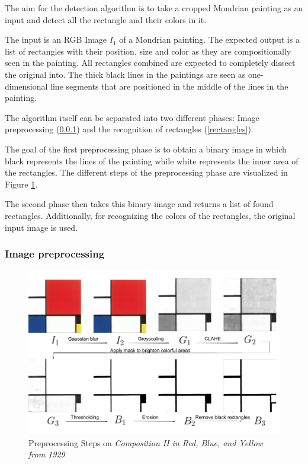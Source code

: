 \documentclass[serif,article,noparskip]{agse-thesis}
\begin{document}
The aim for the detection algorithm is to take a cropped Mondrian painting as
an input and detect all the rectangle and their colors in it.

The input is an RGB Image $I_1$ of a Mondrian painting. The expected output is a
list of rectangles with their position, size and color as they are
compositionally seen in the painting. All rectangles combined are expected to
completely dissect the original into. The thick black lines in the paintings are
seen as one-dimensional line segments that are positioned in the middle of the
lines in the painting.

The algorithm itself can be separated into two different phases: Image
preprocessing (\ref{preprocessing}) and the recognition of rectangles (\ref{rectangles}).

The goal of the first preprocessing phase is to obtain a binary image in which
black represents the lines of the painting while white represents the inner area
of the rectangles. The different steps of the preprocessing phase are visualized
in Figure \ref{fig:preprocessing}.

The second phase then takes this binary image and returns a list of found
rectangles. Additionally, for recognizing the colors of the rectangles, the
original input image is used.

\subsubsection{Image preprocessing} \label{preprocessing}

\begin{figure}
  \includegraphics[width=\linewidth]{images/preprocessing_steps.png}
  \caption{Preprocessing Steps on \textit{Composition II in Red, Blue, and Yellow
  from 1929}}
  \label{fig:preprocessing}
\end{figure}
\end{document}
